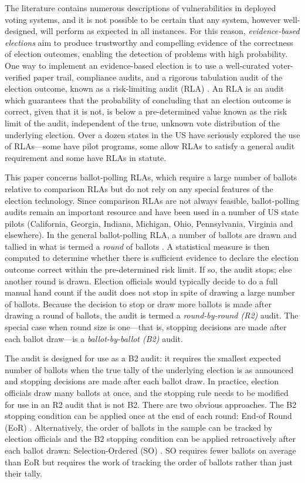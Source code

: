 The literature contains numerous descriptions of vulnerabilities in deployed voting systems, and it is not possible to be certain that any system, however well-designed, will perform as expected in all instances. For this reason, 
{\em evidence-based elections} \cite{evidence-based} aim to produce trustworthy and compelling evidence of the correctness of election outcomes, enabling the detection of problems with high probability. One way to implement an evidence-based election is to use a well-curated voter-verified paper trail, compliance audits, and a rigorous tabulation audit of the election outcome, known as a risk-limiting audit (RLA) \cite{RLA}. An RLA is an audit which guarantees that the probability of concluding that an election outcome is correct, given that it is not, is below a pre-determined value known as the risk limit of the audit, independent of the true, unknown vote distribution of the underlying election. Over a dozen states in the US have seriously explored the use of RLAs---some have pilot programs, some allow RLAs to satisfy a general audit requirement and some have RLAs in statute.     

This paper concerns ballot-polling RLAs, which require a large number of ballots relative to comparison RLAs but do not rely on any special features of the election technology. Since comparison RLAs are not always feasible, ballot-polling audits remain an important resource and have been used in a number of US state pilots (California, Georgia, Indiana, Michigan, Ohio, Pennsylvania, Virginia and elsewhere). In the general ballot-polling RLA, a number of ballots are drawn and tallied in what is termed a {\em round} of ballots \cite{usenix_minerva}. A statistical measure is then computed to determine whether there is sufficient evidence to declare the election outcome correct within the pre-determined risk limit. If so, the audit stops; else another round is drawn. Election officials would typically decide to do a full manual hand count if the audit does not stop in spite of drawing a large number of ballots. Because the decision to stop or draw more ballots is made after drawing a round of ballots, the audit is termed a {\em round-by-round (R2)} audit. The special case when round size is one---that is, stopping decisions are made after each ballot draw---is a {\em ballot-by-ballot (B2)} audit.

The \BRAVO audit is designed for use as a B2 audit: it requires the smallest expected number of ballots when the true tally of the underlying election is as announced and stopping decisions are made after each ballot draw. In practice, election officials draw many ballots at once, and the \BRAVO stopping rule needs to be modified for use in an R2 audit that is not B2. There are two obvious approaches. The B2 stopping condition can be applied once at the end of each round: End-of Round (EoR) \BRAVO.  Alternatively, the order of ballots in the sample can be tracked by election officials and the B2 \BRAVO stopping condition can be applied retroactively after each ballot drawn: Selection-Ordered (SO) \BRAVO. SO \BRAVO requires fewer ballots on average than EoR \BRAVO but requires the work of tracking the order of ballots rather than just their tally. 

